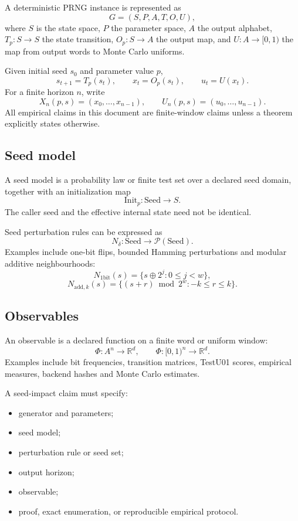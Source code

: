 \documentclass[11pt,a4paper]{article}
\begin{document}
A deterministic PRNG instance is represented as
\[
G=(S,P,A,T,O,U),
\]
where $S$ is the state space, $P$ the parameter space, $A$ the output alphabet, $T_p:S\to S$ the state transition, $O_p:S\to A$ the output map, and $U:A\to[0,1)$ the map from output words to Monte Carlo uniforms.

Given initial seed $s_0$ and parameter value $p$,
\[
s_{t+1}=T_p(s_t),
\qquad
x_t=O_p(s_t),
\qquad
u_t=U(x_t).
\]
For a finite horizon $n$, write
\[
X_n(p,s)=(x_0,\ldots,x_{n-1}),
\qquad
U_n(p,s)=(u_0,\ldots,u_{n-1}).
\]
All empirical claims in this document are finite-window claims unless a theorem explicitly states otherwise.

\subsection{Seed model}

A seed model is a probability law or finite test set over a declared seed domain, together with an initialization map
\[
\mathrm{Init}_p:\mathrm{Seed}\to S.
\]
The caller seed and the effective internal state need not be identical.

Seed perturbation rules can be expressed as
\[
N_\delta:\mathrm{Seed}\to\mathcal P(\mathrm{Seed}).
\]
Examples include one-bit flips, bounded Hamming perturbations and modular additive neighbourhoods:
\[
N_{\mathrm{1bit}}(s)=\{s\oplus 2^j:0\leq j<w\},
\]
\[
N_{\mathrm{add},k}(s)=\{(s+r)\bmod 2^w:-k\leq r\leq k\}.
\]

\subsection{Observables}

An observable is a declared function on a finite word or uniform window:
\[
\Phi:A^n\to\mathbb R^d,
\qquad
\Phi:[0,1)^n\to\mathbb R^d.
\]
Examples include bit frequencies, transition matrices, TestU01 scores, empirical measures, backend hashes and Monte Carlo estimates.

A seed-impact claim must specify:
\begin{itemize}
  \item generator and parameters;
  \item seed model;
  \item perturbation rule or seed set;
  \item output horizon;
  \item observable;
  \item proof, exact enumeration, or reproducible empirical protocol.
\end{itemize}
\end{document}

